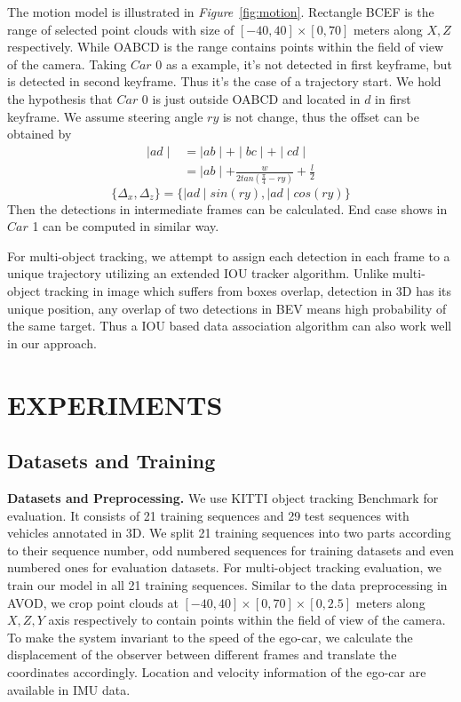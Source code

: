\documentclass[letterpaper, 10 pt, conference]{ieeeconf}  %
\def\figurename{\emph{Figure}}
\begin{document}
The motion model is illustrated in \figurename \, \ref{fig:motion}. Rectangle BCEF is the range of selected point clouds with size of $[-40,40] \times [0, 70]$ meters along $X, Z$ respectively. While OABCD is the range contains points within the field of view of the camera. Taking $Car$ 0 as a example, it's not detected in first keyframe, but is detected in second keyframe. Thus it's the case of a trajectory start. We hold the hypothesis that $Car$ 0 is just outside OABCD and located in $d$ in first keyframe. We assume steering angle $ry$ is not change, thus the offset can be obtained by
\vspace{-0.2cm}
\begin{equation}
\begin{split}
\mid ad \mid   &= \mid ab \mid + \mid bc \mid + \mid cd \mid  \\
			   &= \mid ab \mid + \frac{w}{2tan(\frac{\pi}{4} - ry)} + \frac{l}{2}
\end{split}
\end{equation}
\begin{equation}
\{\Delta_x, \Delta_z\} = \{\mid ad \mid sin(ry), \mid ad \mid cos(ry)\}
\end{equation}
Then the detections in intermediate frames can be calculated. End case shows in $Car$ 1 can be computed in similar way.

For multi-object tracking, we attempt to assign each detection in each frame to a unique trajectory utilizing an extended IOU tracker algorithm\cite{bochinski2018extending}. Unlike multi-object tracking in image which suffers from boxes overlap, detection in 3D has its unique position, any overlap of two detections in BEV means high probability of the same target. Thus a IOU based data association algorithm can also work well in our approach.

\section{EXPERIMENTS}
\subsection{Datasets and Training}

\textbf{Datasets and Preprocessing.} We use KITTI object tracking Benchmark \cite{geiger2013vision} for evaluation. It consists of 21 training sequences and 29 test sequences with vehicles annotated in 3D. We split 21 training sequences into two parts according to their sequence number, odd numbered sequences for training datasets and even numbered ones for evaluation datasets. For multi-object tracking evaluation, we train our model in all 21 training sequences. Similar to the data preprocessing in AVOD\cite{ku2018joint}, we crop point clouds at $[-40, 40] \times [0, 70] \times [0, 2.5]$ meters along $X, Z, Y$ axis respectively to contain points within the field of view of the camera. To make the system invariant to the speed of the ego-car, we calculate the displacement of the observer between different frames and translate the coordinates accordingly. Location and velocity information of the ego-car are available in IMU data.
\end{document}
